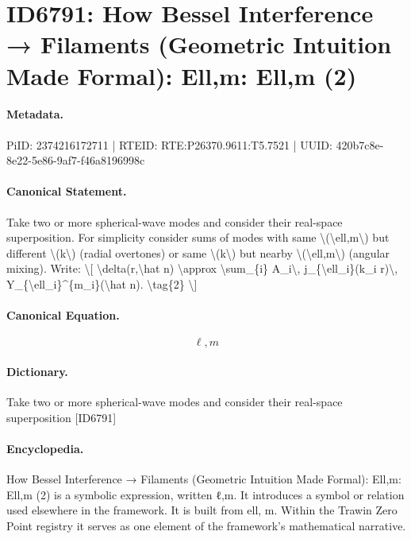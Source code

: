 \section*{ID6791: How Bessel Interference → Filaments (Geometric Intuition Made Formal): Ell,m: Ell,m (2)}
\paragraph{Metadata.}
PiID: 2374216172711 | RTEID: RTE:P26370.9611:T5.7521 | UUID: 420b7c8e-8e22-5e86-9af7-f46a8196998c

\paragraph{Canonical Statement.}
Take two or more spherical-wave modes and consider their real-space superposition. For simplicity consider sums of modes with same \textbackslash{}(\textbackslash{}ell,m\textbackslash{}) but different \textbackslash{}(k\textbackslash{}) (radial overtones) or same \textbackslash{}(k\textbackslash{}) but nearby \textbackslash{}(\textbackslash{}ell,m\textbackslash{}) (angular mixing). Write: \textbackslash{}[ \textbackslash{}delta(r,\textbackslash{}hat n) \textbackslash{}approx \textbackslash{}sum\_\{i\} A\_i\textbackslash{}, j\_\{\textbackslash{}ell\_i\}(k\_i r)\textbackslash{}, Y\_\{\textbackslash{}ell\_i\}\textasciicircum{}\{m\_i\}(\textbackslash{}hat n). \textbackslash{}tag\{2\} \textbackslash{}]

\paragraph{Canonical Equation.}
\[
\ell,m
\]

\paragraph{Dictionary.}
Take two or more spherical-wave modes and consider their real-space superposition [ID6791]

\paragraph{Encyclopedia.}
How Bessel Interference → Filaments (Geometric Intuition Made Formal): Ell,m: Ell,m (2) is a symbolic expression, written ℓ,m. It introduces a symbol or relation used elsewhere in the framework. It is built from ell, m. Within the Trawin Zero Point registry it serves as one element of the framework's mathematical narrative.
